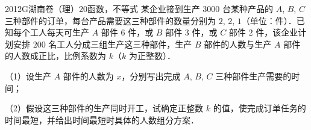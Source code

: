 
\begin{problem}{2012}{G}{湖南卷（理）}{20}{函数，不等式}
某企业接到生产 3000 台某种产品的 $ A $, $ B $, $ C $ 三种部件的订单，每台产品需要这三种部件的数量分别为 $ 2 $, $ 2 $, $ 1 $（单位：件）．已知每个工人每天可生产 $ A $ 部件 $ 6 $ 件，或 $ B $ 部件 $ 3 $ 件，或 $ C $ 部件 $ 2 $ 件，该企业计划安排 $ 200 $ 名工人分成三组生产这三种部件，生产 $ B $ 部件的人数与生产 $ A $ 部件的人数成正比，比例系数为 $ k $（$ k $ 为正整数）．

（1）设生产 $ A $ 部件的人数为 $ x $，分别写出完成 $ A $, $ B $, $ C $ 三种部件生产需要的时间；

（2）假设这三种部件的生产同时开工，试确定正整数 $ k $ 的值，使完成订单任务的时间最短，并给出时间最短时具体的人数组分方案．
\end{problem}